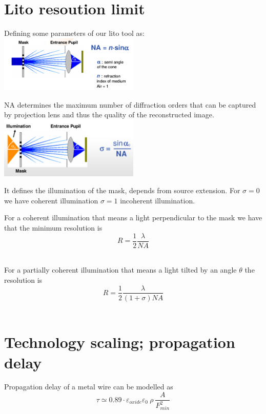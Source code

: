 \section{Lito resoution limit}
Defining some parameters of our lito tool as:\\

\centering
\includegraphics[width=0.5\textwidth]{NA.png}\\
\raggedright

NA determines the maximum number of diffraction orders that can be captured by projection lens and thus the quality of the reconstructed image.\\

\centering
\includegraphics[width=0.5\textwidth]{sigma.png}\\
\raggedright

It defines the illumination of the mask, depends from source extension. For $\sigma=0$ we have coherent illumination $\sigma=1$ incoherent illumination.\\

\vspace{3mm}

For a coherent illumination that means a light perpendicular to the mask we have that the minimum resolution is 
\begin{equation}
R=\frac{1}{2}\frac{\lambda}{NA}
\end{equation}
\\
\vspace{3mm}

For a partially coherent illumination that means a light tilted by an angle $\theta$ the resolution is
\begin{equation}
R=\frac{1}{2}\frac{\lambda}{(1+\sigma)NA}
\end{equation}
\\










\section{Technology scaling; propagation delay}
Propagation delay of a metal wire can be modelled as
\begin{equation}
\tau\simeq 0.89 \cdot \varepsilon_{oxide}\varepsilon_0 \ \rho \  \frac{A}{F_{min}^2} 
\end{equation}
\\















